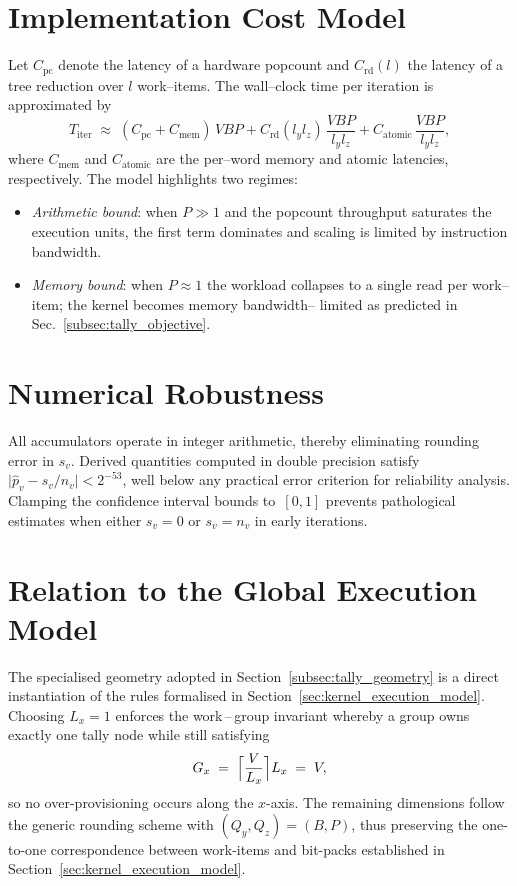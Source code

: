 \section{Implementation Cost Model}
\label{subsec:tally_cost_model}

Let \(C_{\mathrm{pc}}\) denote the latency of a hardware popcount and
\(C_{\mathrm{rd}}(l)\) the latency of a tree reduction over \(l\) work--items.
The wall--clock time per iteration is approximated by
\[
  T_{\text{iter}} \;\approx\;
  (C_{\mathrm{pc}} + C_{\mathrm{mem}})\,VBP +
  C_{\mathrm{rd}}(l_y l_z)\,\frac{VBP}{l_y l_z}
  + C_{\mathrm{atomic}}\,\frac{VBP}{l_y l_z},
\]
where \(C_{\mathrm{mem}}\) and \(C_{\mathrm{atomic}}\) are the per--word memory
and atomic latencies, respectively.  The model highlights two regimes:
\begin{itemize}
  \item\emph{Arithmetic bound}: when \(P\gg 1\) and the popcount throughput
        saturates the execution units, the first term dominates and scaling is
        limited by instruction bandwidth.
  \item\emph{Memory bound}: when \(P\approx 1\) the workload collapses to a
        single read per work--item; the kernel becomes memory bandwidth--
        limited as predicted in Sec.~\ref{subsec:tally_objective}.
\end{itemize}


\section{Numerical Robustness}
\label{subsec:tally_numerics}

All accumulators operate in integer arithmetic, thereby eliminating rounding
error in \(s_v\).  Derived quantities computed in double precision satisfy
\(\lvert\widehat{p}_v - s_v/n_v\rvert < 2^{-53}\), well below any practical
error criterion for reliability analysis.  Clamping the confidence interval
bounds to~\([0,1]\) prevents pathological estimates when either \(s_v=0\) or
\(s_v=n_v\) in early iterations.

\section{Relation to the Global Execution Model}
\label{subsec:tally_exec_relation}

The specialised geometry adopted in Section~\ref{subsec:tally_geometry} is a direct instantiation of the rules formalised in Section~\ref{sec:kernel_execution_model}.  Choosing $L_x=1$ enforces the work\,–\,group invariant whereby a group owns exactly one tally node while still satisfying
\[
   G_x \;=\; \Bigl\lceil \frac{V}{L_x} \Bigr\rceil L_x \;=\; V ,
\]
so no over-provisioning occurs along the $x$-axis.  The remaining dimensions follow the generic rounding scheme with $(Q_y,Q_z)=(B,P)$, thus preserving the one-to-one correspondence between work-items and bit-packs established in Section~\ref{sec:kernel_execution_model}.